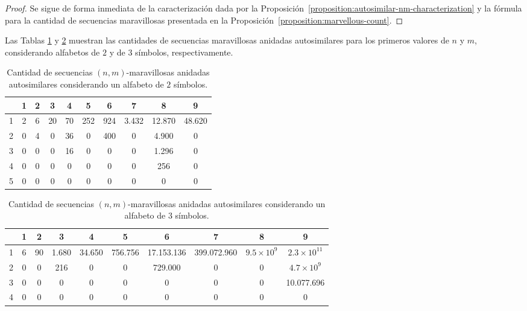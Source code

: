 \begin{proof}
	Se sigue de forma inmediata de la caracterización dada por la
	Proposición~\ref{proposition:autosimilar-nm-characterization}
	y la fórmula para la cantidad de secuencias maravillosas presentada en la
	Proposición~\ref{proposition:marvellous-count}.
\end{proof}

Las Tablas \ref{table:count-autosimilar-2} y \ref{table:count-autosimilar-3}
muestran las cantidades de secuencias maravillosas anidadas
autosimilares para los primeros valores de $n$ y $m$, considerando alfabetos
de $2$ y de $3$ símbolos, respectivamente.

\begin{table}[H]
	\centering
	\small
	\begin{tabular}{|c|c|c|c|c|c|c|c|c|c|}
		\hline
		\diagbox[width=3em]{$n$}{$m$}	& 1 & 2 & 3  & 4  & 5   & 6   & 7    & 8     & 9     \\
		\hline
		1 & 2 & 6 & 20 & 70 & 252 & 924 & 3.432 & 12.870 & 48.620
		\\ \hline
		2 & 0 & 4 & 0  & 36 & 0   & 400 & 0     & 4.900  & 0     \\
		\hline
		3 & 0 & 0 & 0  & 16 & 0   & 0   & 0     & 1.296  & 0     \\
		\hline
		4 & 0 & 0 & 0  & 0  & 0   & 0   & 0     & 256    & 0     \\
		\hline
		5 & 0 & 0 & 0  & 0  & 0   & 0   & 0     & 0      & 0     \\
		\hline
	\end{tabular}
	\caption{Cantidad de secuencias $(n,m)$-maravillosas anidadas autosimilares
		considerando un alfabeto de $2$ símbolos.}
	\label{table:count-autosimilar-2}
\end{table}

\begin{table}[H]
	\centering
	\small
	\begin{tabular}{|c|c|c|c|c|c|c|c|c|c|}
		\hline
		\diagbox[width=3em]{$n$}{$m$} & 1 & 2 & 3 & 4 & 5 & 6 & 7 & 8 & 9 \\ \hline
		1 & 6 & 90 & 1.680 & 34.650 & 756.756 & 17.153.136 & 399.072.960 & $9.5 \times 10^{9}$ & $2.3 \times 10^{11}$ \\ \hline
		2 & 0 & 0  & 216   & 0      & 0       & 729.000    & 0           & 0             & $4.7 \times 10^{9}$ \\ \hline
		3 & 0 & 0  & 0     & 0      & 0       & 0          & 0           & 0             & 10.077.696    \\ \hline
		4 & 0 & 0  & 0     & 0      & 0       & 0          & 0           & 0             & 0 \\
		\hline
	\end{tabular}
	\caption{Cantidad de secuencias $(n,m)$-maravillosas anidadas autosimilares
		considerando un alfabeto de $3$ símbolos.}
	\label{table:count-autosimilar-3}
\end{table}


